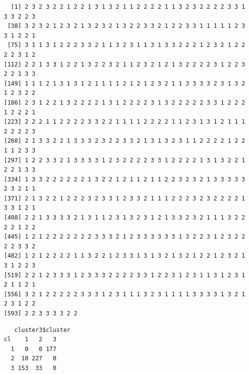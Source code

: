 \documentclass{article}
\newenvironment{Shaded}{\begin{snugshade}}{\end{snugshade}}
\newcommand{\FunctionTok}[1]{\textcolor[rgb]{0.28,0.35,0.67}{#1}}
\newcommand{\NormalTok}[1]{\textcolor[rgb]{0.00,0.23,0.31}{#1}}
\newcommand{\SpecialCharTok}[1]{\textcolor[rgb]{0.37,0.37,0.37}{#1}}
\begin{document}
\begin{Shaded}
\end{Shaded}

\begin{verbatim}
  [1] 2 3 2 3 2 2 1 2 2 1 3 1 3 2 1 1 2 2 2 2 1 1 3 2 3 2 2 2 2 3 3 1 3 3 2 2 3
 [38] 3 2 3 2 1 2 3 2 1 3 2 3 2 1 3 2 2 3 3 2 1 2 2 3 3 1 1 1 1 1 2 3 3 1 2 2 1
 [75] 3 1 1 3 1 2 2 2 3 3 2 1 1 3 2 3 1 1 3 1 3 3 2 2 2 1 2 3 2 1 2 2 2 2 3 1 2
[112] 2 2 1 3 3 1 2 2 1 3 2 2 3 2 1 1 2 3 2 1 2 1 3 2 2 2 2 3 1 2 2 3 2 2 1 3 3
[149] 1 1 1 2 1 3 1 3 1 2 1 1 1 1 2 1 2 1 2 3 2 1 1 3 3 3 3 2 3 1 3 2 1 2 3 2 2
[186] 2 3 1 2 2 1 3 2 2 2 2 1 3 1 2 2 2 2 3 1 3 2 2 2 2 2 3 3 1 2 2 2 1 2 2 2 1
[223] 2 2 2 1 1 2 2 2 2 3 3 2 2 1 1 1 1 2 2 2 2 1 1 2 3 1 3 1 2 1 1 1 2 2 2 2 3
[260] 2 1 3 3 2 2 1 3 3 3 2 3 2 2 3 3 2 1 3 1 3 2 3 1 1 2 2 2 2 1 2 2 1 1 2 3 3
[297] 1 2 2 3 3 2 1 3 3 3 3 1 2 3 2 2 2 2 3 3 1 2 2 2 2 1 3 1 3 2 2 1 2 2 1 3 3
[334] 1 3 3 2 2 2 2 2 2 1 3 2 2 1 2 1 1 2 1 1 2 2 3 2 3 2 1 3 3 3 3 3 2 3 2 1 1
[371] 2 1 3 2 2 1 2 2 2 3 2 3 3 1 2 3 3 2 1 1 1 2 2 2 3 2 3 2 2 2 2 1 3 3 1 2 1
[408] 2 2 1 3 3 3 3 2 1 3 1 1 2 3 1 3 2 3 1 2 1 3 3 2 3 2 1 1 1 3 2 2 2 2 1 2 2
[445] 1 2 1 2 2 2 2 2 2 2 3 3 3 2 1 2 3 3 3 3 3 3 1 3 2 2 3 1 2 3 2 2 2 2 3 3 2
[482] 1 2 1 2 2 2 2 1 1 3 2 2 1 2 3 3 1 3 1 3 2 1 3 2 1 2 2 1 2 3 2 1 3 1 2 2 3
[519] 2 2 1 2 3 3 3 1 2 3 3 3 2 2 2 2 3 3 1 2 2 3 1 2 3 1 1 3 1 2 3 1 2 1 1 2 1
[556] 3 2 1 2 2 2 2 2 3 3 3 1 2 3 1 1 1 3 2 3 1 1 1 1 3 3 3 3 1 3 2 1 2 3 1 2 2
[593] 2 2 3 3 3 3 2 2
\end{verbatim}

\begin{Shaded}
\end{Shaded}

\begin{verbatim}
   cluster3$cluster
cl    1   2   3
  1   0   0 177
  2  10 227   0
  3 153  33   0
\end{verbatim}
\end{document}
